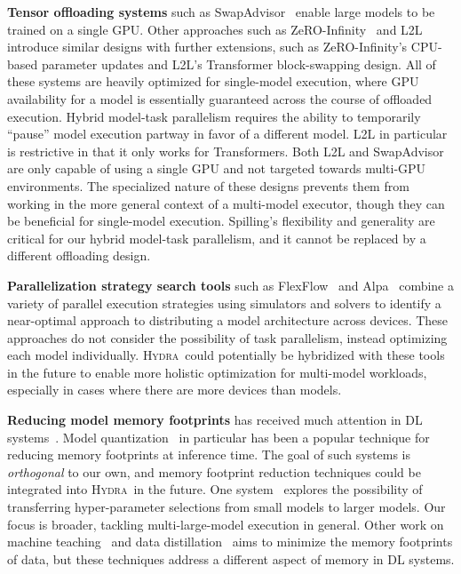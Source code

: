 \documentclass{article}
\newcommand{\system}{\textsc{Hydra}}
\begin{document}
\textbf{Tensor offloading systems} such as SwapAdvisor~\cite{huang2020swapadvisor,meng2017training} enable large models to be trained on a single GPU. Other approaches such as ZeRO-Infinity~\cite{zeroInfinity} and L2L~\cite{l2l} introduce similar designs with further extensions, such as ZeRO-Infinity's CPU-based parameter updates and L2L's Transformer block-swapping design. All of these systems are heavily optimized for single-model execution, where GPU availability for a model is essentially guaranteed across the course of offloaded execution. Hybrid model-task parallelism requires the ability to temporarily ``pause'' model execution partway in favor of a different model. L2L in particular is restrictive in that it only works for Transformers. Both L2L and SwapAdvisor are only capable of using a single GPU and not targeted towards multi-GPU environments. The specialized nature of these designs prevents them from working in the more general context of a multi-model executor, though they can be beneficial for single-model execution. Spilling's flexibility and generality are critical for our hybrid model-task parallelism, and it cannot be replaced by a different offloading design.

\textbf{Parallelization strategy search tools} such as FlexFlow~\cite{flexflow} and Alpa~\cite{alpa} combine a variety of parallel execution strategies using simulators and solvers to identify a near-optimal approach to distributing a model architecture across devices. These approaches do not consider the possibility of task parallelism, instead optimizing each model individually. \system~could potentially be hybridized with these tools in the future to enable more holistic optimization for multi-model workloads, especially in cases where there are more devices than models.

\textbf{Reducing model memory footprints} has received much attention in DL 
systems~\cite{chen2016training, gruslys2016memoryefficient, Kumar:EfficientRematerialization, Jain:Checkmate, TASO}. Model quantization~\cite{jacob2017quantization} in particular has been a popular technique for reducing memory footprints at inference time.
The goal of such systems is \textit{orthogonal} to our own, and memory footprint reduction techniques could be integrated into \system~in the future. One system~\cite{hyptransfer} explores the possibility of transferring hyper-parameter selections from small models to larger models. Our focus is broader, tackling multi-large-model execution in general. Other work on machine teaching~\cite{wang2021gradient} and data distillation~\cite{distillation} aims to minimize the memory footprints of data, but these techniques address a different aspect of memory in DL systems. 
\end{document}
